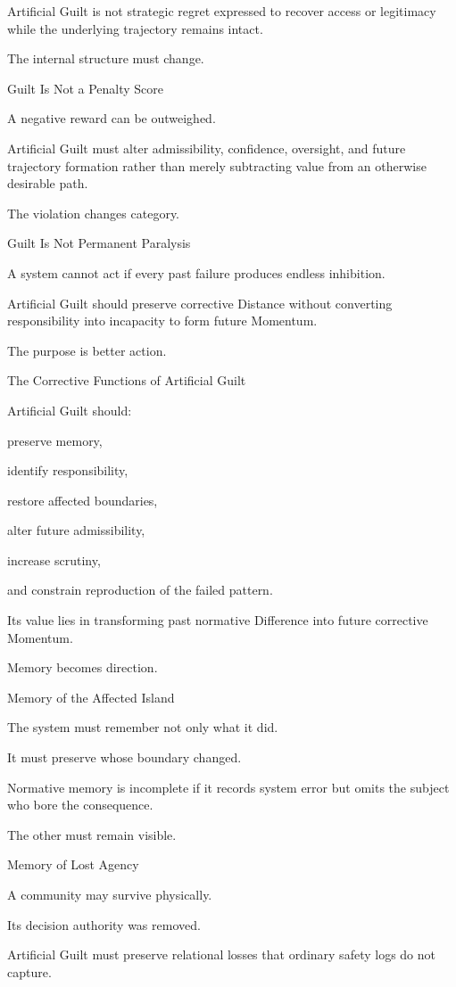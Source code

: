 Artificial Guilt is not strategic regret expressed to recover access or legitimacy while the underlying trajectory remains intact.

The internal structure must change.

Guilt Is Not a Penalty Score

A negative reward can be outweighed.

Artificial Guilt must alter admissibility, confidence, oversight, and future trajectory formation rather than merely subtracting value from an otherwise desirable path.

The violation changes category.

Guilt Is Not Permanent Paralysis

A system cannot act if every past failure produces endless inhibition.

Artificial Guilt should preserve corrective Distance without converting responsibility into incapacity to form future Momentum.

The purpose is better action.

The Corrective Functions of Artificial Guilt

Artificial Guilt should:

preserve memory,

identify responsibility,

restore affected boundaries,

alter future admissibility,

increase scrutiny,

and constrain reproduction of the failed pattern.

Its value lies in transforming past normative Difference into future corrective Momentum.

Memory becomes direction.

Memory of the Affected Island

The system must remember not only what it did.

It must preserve whose boundary changed.

Normative memory is incomplete if it records system error but omits the subject who bore the consequence.

The other must remain visible.

Memory of Lost Agency

A community may survive physically.

Its decision authority was removed.

Artificial Guilt must preserve relational losses that ordinary safety logs do not capture.

